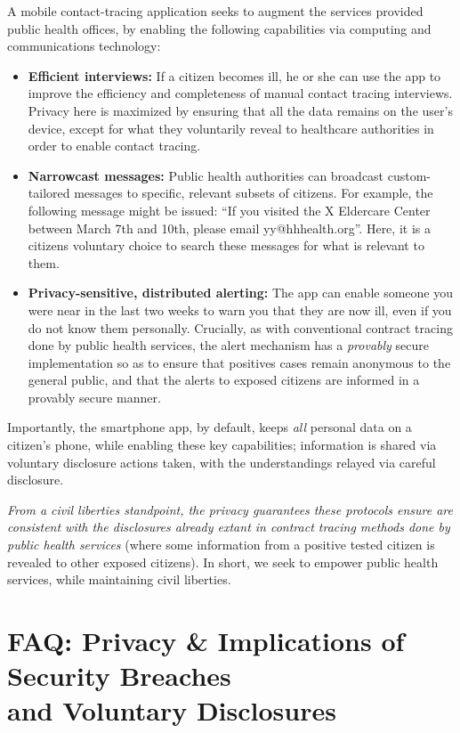 \documentclass{article}
\begin{document}
A mobile contact-tracing application seeks to augment the services provided public health offices, by enabling the following capabilities via computing and communications technology:

\begin{itemize}
\item \textbf{Efficient interviews:}  If a citizen becomes ill, he or she can use the app to improve the efficiency and completeness of manual contact tracing interviews. Privacy here is maximized by ensuring that all the data remains on the user's device, except for what they voluntarily reveal to healthcare authorities in order to enable contact tracing.

\item \textbf{Narrowcast messages:}  Public health authorities can broadcast
  custom-tailored messages to specific, relevant subsets of citizens.  For example, the following message might be issued: ``If you visited
  the X Eldercare Center between March 7th and 10th, please email yy@hhhealth.org''.  Here, it is a citizens voluntary choice to search these messages for what is relevant to them.
  
\item \textbf{Privacy-sensitive, distributed alerting:}  The app can enable someone you were near in the last two weeks to warn you that they are now ill, even if you do not know them personally.  Crucially, as with conventional contract tracing done by public health services, the alert mechanism has a \emph{provably} secure implementation so as to ensure that positives cases remain anonymous to the general public, and that the alerts to exposed citizens are informed in a provably secure manner.
\end{itemize}

Importantly, the smartphone app, by default, keeps \emph{all} personal data on a citizen's phone, while enabling these key capabilities; information is shared via voluntary disclosure actions taken, with the understandings relayed via careful disclosure. 

\emph{From a civil liberties standpoint, the privacy guarantees these protocols ensure are consistent with the disclosures already extant in contract tracing methods done by public health services} (where some information from a positive tested citizen is revealed to other exposed citizens). In short, we seek to empower public health services, while maintaining civil liberties.
 
\section{FAQ: Privacy \& Implications of Security Breaches\\ and Voluntary Disclosures} 
\end{document}
